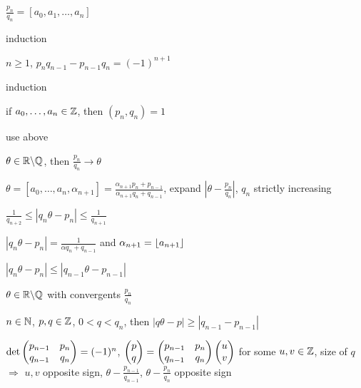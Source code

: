 \begin{lemma}
    $\frac{p_n}{q_n} = [a_0, a_1, \dots, a_n]$
\end{lemma}
\begin{pf}
    induction
\end{pf}

\begin{lemma}
    $n \geq 1$, $p_{n}q_{n-1} - p_{n-1}q_n = (-1)^{n+1}$
\end{lemma}
\begin{pf}
    induction
\end{pf}

\begin{lemma}
    if $a_0, \dots, a_n \in \mathbb{Z}$, then $(p_n, q_n) = 1$
\end{lemma}
\begin{pf}
    use above
\end{pf}

\begin{prop}
    $\theta \in \mathbb{R} \backslash \mathbb{Q}$, then $\frac{p_n}{q_n}\rightarrow\theta$
\end{prop}
\begin{pf}
    $\theta = [a_0, \dots, a_n, \alpha_{n+1}] = \frac{\alpha_{n+1}p_n + p_{n-1}}{\alpha_{n+1} q_n + q_{n-1}}$,
    expand $|\theta - \frac{p_n}{q_n}|$, $q_n$ strictly increasing
\end{pf}

\begin{lemma}
    $\frac{1}{q_{n+2}} \leq |q_n \theta - p_n| \leq \frac{1}{q_{n+1}}$
\end{lemma}
\begin{pf}
    $|q_n \theta - p_n| = \frac{1}{\alpha q_n + q_{n-1}}$ and $\alpha_{n+1} = \lfloor a_{n+1}\rfloor$
\end{pf}
\begin{fact}
    $|q_n \theta - p_n| \leq |q_{n-1}\theta - p_{n-1}|$
\end{fact}

\begin{setting}
    $\theta \in \mathbb{R} \backslash \mathbb{Q}$ with convergents $\frac{p_n}{q_n}$
\end{setting}

\begin{thm}
    $n \in \mathbb{N}$, $p, q \in \mathbb{Z}$, $0 < q < q_{n}$, then $|q\theta - p| \geq |q_{n-1} - p_{n-1}|$
\end{thm}
\begin{pf}
    $\det \begin{pmatrix} p_{n-1} & p_n \\ q_{n-1} & q_n \end{pmatrix} = (-1)^n$, $\begin{pmatrix} p \\ q \end{pmatrix} = \begin{pmatrix} p_{n-1} & p_n \\ q_{n-1} & q_n \end{pmatrix} \begin{pmatrix} u \\ v \end{pmatrix}$ for some $u, v \in \mathbb{Z}$,
    size of $q$ $\Rightarrow$ $u, v$ opposite sign, $\theta - \frac{p_{n-1}}{q_{n-1}}$, $\theta - \frac{p_{n}}{q_{n}}$ opposite sign
\end{pf}

